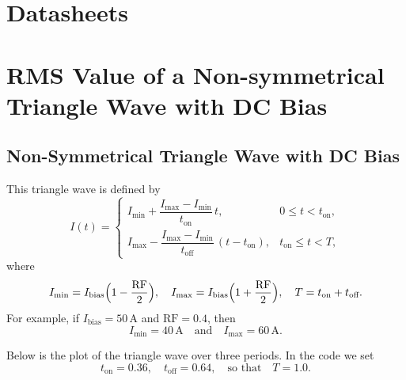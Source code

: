 \documentclass{article}
\begin{document}
\appendix
\section{Datasheets}
\label{appendix:datasheets}



\section{RMS Value of a Non-symmetrical Triangle Wave with DC Bias}
\label{app:rmsderivation}
\subsection{Non-Symmetrical Triangle Wave with DC Bias}

This triangle wave is defined by
\[
I(t) = \begin{cases}
I_{\min} + \dfrac{I_{\max}-I_{\min}}{t_{\text{on}}}\,t, & 0\le t < t_{\text{on}}, \\[1mm]
I_{\max} - \dfrac{I_{\max}-I_{\min}}{t_{\text{off}}}\,(t-t_{\text{on}}), & t_{\text{on}}\le t < T,
\end{cases}
\]
where
\[
I_{\min} = I_{\text{bias}}\Bigl(1-\frac{\text{RF}}{2}\Bigr),\quad
I_{\max} = I_{\text{bias}}\Bigl(1+\frac{\text{RF}}{2}\Bigr),\quad
T = t_{\text{on}}+t_{\text{off}}.
\]
For example, if \(I_{\text{bias}}=50\,\text{A}\) and \(\text{RF}=0.4\), then
\[
I_{\min}=40\,\text{A}\quad \text{and}\quad I_{\max}=60\,\text{A}.
\]

Below is the plot of the triangle wave over three periods. In the code we set
\[
t_{\text{on}}=0.36,\quad t_{\text{off}}=0.64,\quad \text{so that} \quad T=1.0.
\]

\end{document}
